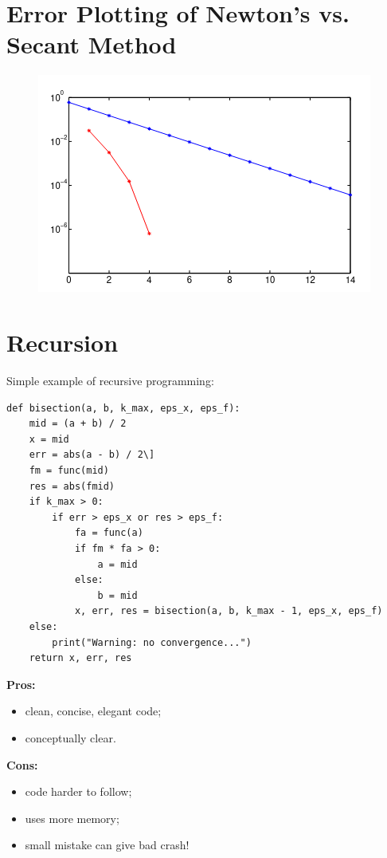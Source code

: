 \documentclass{article}
\begin{document}
\clearpage

\section*{Error Plotting of Newton's vs. Secant Method}

\begin{figure}
	\centering
	\includegraphics[width=\textwidth]{res/04a.png}
	\caption{}
\end{figure}
\clearpage

\section*{Recursion}

Simple example of recursive programming:

\begin{verbatim}
def bisection(a, b, k_max, eps_x, eps_f):
	mid = (a + b) / 2
	x = mid
	err = abs(a - b) / 2\]
	fm = func(mid)
	res = abs(fmid)
	if k_max > 0:
		if err > eps_x or res > eps_f:
			fa = func(a)
			if fm * fa > 0:
				a = mid
			else:
				b = mid
			x, err, res = bisection(a, b, k_max - 1, eps_x, eps_f)
	else:
		print("Warning: no convergence...")
	return x, err, res
\end{verbatim}

\textbf{Pros:}
\begin{itemize}
	\item clean, concise, elegant code;
	\item conceptually clear.
\end{itemize}

\textbf{Cons:}
\begin{itemize}
	\item code harder to follow;
	\item uses more memory;
	\item small mistake can give bad crash! 
\end{itemize}
\end{document}
